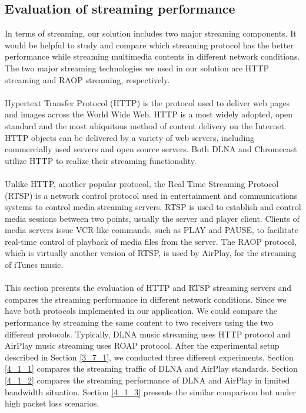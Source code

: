 \subsection{Evaluation of streaming performance\label{4_1}}
In terms of streaming, our solution includes two major streaming components. It
would be helpful to study and compare which streaming protocol has the better
performance while streaming multimedia contents in different network conditions.
The two major streaming technologies we used in our solution are HTTP streaming
and RAOP streaming, respectively.\\
\\
Hypertext Transfer Protocol (HTTP) is the protocol used to deliver web pages
and images across the World Wide Web. HTTP is a most widely adopted, open
standard and the most ubiquitous method of content delivery on the Internet.
HTTP objects can be delivered by a variety of web servers, including
commercially used servers and open source servers. Both DLNA and Chromecast utilize
HTTP to realize their streaming functionality.\\
\\
Unlike HTTP, another popular protocol, the Real Time Streaming Protocol (RTSP)
is a network control protocol used in entertainment and communications systems
to control media streaming servers. RTSP is used to establish and control media
sessions between two points, usually the server and player client. Clients of
media servers issue VCR-like commands, such as PLAY and PAUSE, to facilitate
real-time control of playback of media files from the server.  The RAOP
protocol, which is virtually another version of RTSP, is used by AirPlay, for
the streaming of iTunes music.\\
\\
This section presents the evaluation of HTTP and RTSP streaming servers and compares the streaming performance in different network conditions. Since we have both protocols implemented in our application. We could compare the performance by streaming the same content to two receivers using the two different protocols. Typically, DLNA music streaming uses HTTP protocol and AirPlay music streaming uses ROAP protocol. After the experimental setup described in Section \ref{3_7_1}, we conducted three different experiments. Section \ref{4_1_1} compares the streaming traffic of DLNA and AirPlay standards. Section \ref{4_1_2} compares the streaming performance of DLNA and AirPlay in limited bandwidth situation. Section \ref{4_1_3} presents the similar comparison but under high packet loss scenarios.
